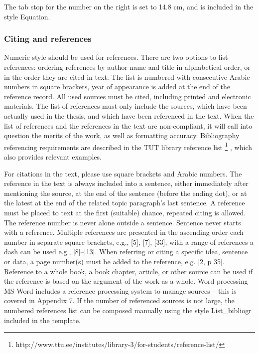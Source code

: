 The tab stop for the number on the right is set to 14.8 cm, and is included in the style
Equation.


\subsubsection{Citing and references}

Numeric style should be used for references. There are two options to list references:
ordering references by author name and title in alphabetical order, or in the order they are cited in text. The list is numbered with consecutive Arabic numbers in square brackets, year of appearance is added at the end of the reference record. All used sources must be cited, including printed and electronic materials. The list of references must only include the sources, which have been actually used in the thesis, and which have been referenced in the text. When the list of references and the references in the text are non-compliant, it will call into question the merits of the work, as well as formatting accuracy. Bibliography referencing requirements are described in the TUT library reference list \footnote{http://www.ttu.ee/institutes/library-3/for-students/reference-list/} , which also
provides relevant examples.

For citations in the text, please use square brackets and Arabic numbers. The reference in
the text is always included into a sentence, either immediately after mentioning the source, at the end of the sentence (before the ending dot), or at the latest at the end of the
related topic paragraph’s last sentence. A reference must be placed to text at the first (suitable) chance, repeated citing is allowed. The reference number is never alone outside a sentence. Sentence never starts with a reference. Multiple references are presented in the ascending order each number in separate square brackets, e.g., [5], [7], [33], with a range of references a dash can be used e.g., [8]–[13]. When referring or citing a specific idea, sentence or data, a page number(s) must be added to the reference, e.g. [2, p 35]. Reference to a whole book, a book chapter, article, or other source can be used if the reference is based on the argument of the work as a whole.
Word processing MS Word includes a reference processing system to manage sources -- this is covered in Appendix 7.
If the number of referenced sources is not large, the numbered references list can be composed manually using the style List\_bibliogr included in the template.

